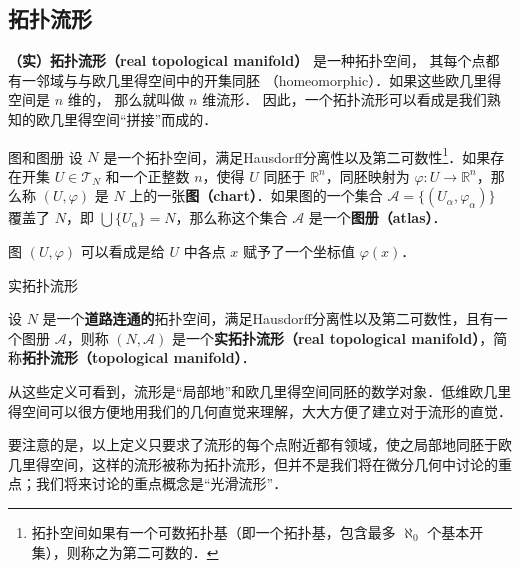 

\subsection{拓扑流形}

\textbf{（实）拓扑流形（real topological manifold）} 是一种拓扑空间， 其每个点都有一邻域与与欧几里得空间中的开集同胚 （homeomorphic）．如果这些欧几里得空间是 $n$ 维的， 那么就叫做 $n$ 维流形． 因此，一个拓扑流形可以看成是我们熟知的欧几里得空间“拼接”而成的．

\begin{definition}{图和图册}\label{Manif_def1}
设 $N$ 是一个拓扑空间，满足Hausdorff分离性以及第二可数性\footnote{拓扑空间如果有一个可数拓扑基（即一个拓扑基，包含最多 $\aleph_0$ 个基本开集），则称之为第二可数的．}．如果存在开集 $U\in\mathcal{T}_N$ 和一个正整数 $n$，使得 $U$ 同胚于 $\mathbb{R}^n$，同胚映射为 $\varphi:U\rightarrow\mathbb{R}^n$，那么称 $(U,\varphi)$ 是 $N$ 上的一张\textbf{图（chart）}．如果图的一个集合 $\mathcal{A}=\{(U_\alpha, \varphi_\alpha)\}$ 覆盖了 $N$，即 $\bigcup\{U_\alpha\}=N$，那么称这个集合 $\mathcal{A}$ 是一个\textbf{图册（atlas）}．
\end{definition}

图 $(U, \varphi)$ 可以看成是给 $U$ 中各点 $x$ 赋予了一个坐标值 $\varphi(x)$．

\begin{definition}{实拓扑流形}\label{Manif_def2}

设 $N$ 是一个\textbf{道路连通的}拓扑空间，满足Hausdorff分离性以及第二可数性，且有一个图册 $\mathcal{A}$，则称 $(N, \mathcal{A})$ 是一个\textbf{实拓扑流形（real topological manifold）}，简称\textbf{拓扑流形（topological manifold）}．

\end{definition}

从这些定义可看到，流形是“局部地”和欧几里得空间同胚的数学对象．低维欧几里得空间可以很方便地用我们的几何直觉来理解，大大方便了建立对于流形的直觉．

要注意的是，以上定义只要求了流形的每个点附近都有领域，使之局部地同胚于欧几里得空间，这样的流形被称为拓扑流形，但并不是我们将在微分几何中讨论的重点；我们将来讨论的重点概念是“光滑流形”．

